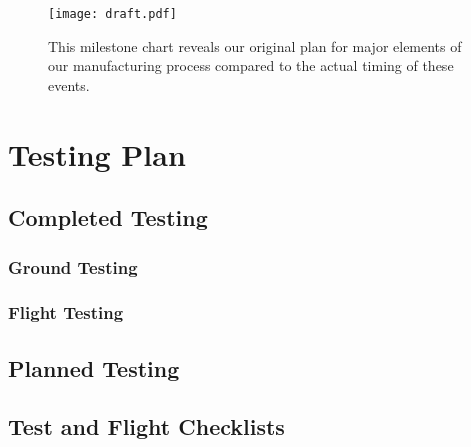 \documentclass[report]{byu-aero}
\begin{document}
\begin{figure}[h!]
	\centering
	\texttt{[image: draft.pdf]}
	\caption{This milestone chart reveals our original plan for major elements of our manufacturing process compared to the actual timing of these events.}
	\label{fig:plannedvsactualtimingmanufacturing}
\end{figure}



\section{Testing Plan} %
\label{sec:TestingPlan}


\subsection{Completed Testing}
\label{ssec:completedtesting}




\subsubsection{Ground Testing}
\label{sssec:groundtesting}



\subsubsection{Flight Testing}
\label{sssec:flighttesting}



\subsection{Planned Testing}
\label{ssec:plannedtesting}



\subsection{Test and Flight Checklists}
\end{document}
